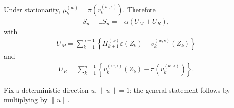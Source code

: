 Under stationarity,
\(\mu_k^{(w)} = \pi(v_k^{(w, \epsilon)})\). Therefore
\begin{equation}
\begin{aligned}
S_n - \mathbb{E}S_n = - \alpha (U_M + U_R),
\end{aligned}
\end{equation}
with
\begin{equation}
\begin{aligned}
U_M
  = \sum_{k=1}^{n-1}
      \left\{H_{k+1}^{(w)} \varepsilon(Z_k)
       - v_k^{(w, \epsilon)}(Z_k)\right\}
\end{aligned}
\end{equation}
and
\begin{equation}
\begin{aligned}
U_R
  = \sum_{k=1}^{n-1}
      \left\{v_k^{(w, \epsilon)}(Z_k)
       - \pi(v_k^{(w, \epsilon)})\right\}.
\end{aligned}
\end{equation}

Fix a deterministic direction \(u\), \(\lVert u \rVert = 1\); the general statement
follows by multiplying by \(\lVert u \rVert\).


